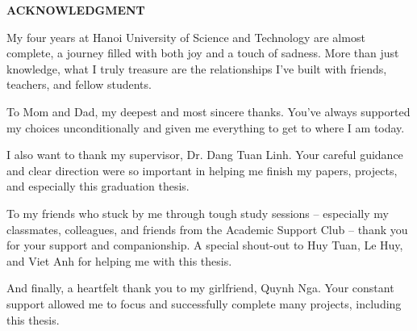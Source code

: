 \documentclass[../main.tex]{subfiles}
\begin{document}
\begin{center}
    \Large{\textbf{ACKNOWLEDGMENT}}\\
\end{center}
\vspace{1cm}

My four years at Hanoi University of Science and Technology are almost complete, a journey filled with both joy and a touch of sadness. More than just knowledge, what I truly treasure are the relationships I've built with friends, teachers, and fellow students.

To Mom and Dad, my deepest and most sincere thanks. You've always supported my choices unconditionally and given me everything to get to where I am today.

I also want to thank my supervisor, Dr. Dang Tuan Linh. Your careful guidance and clear direction were so important in helping me finish my papers, projects, and especially this graduation thesis.

To my friends who stuck by me through tough study sessions – especially my classmates, colleagues, and friends from the Academic Support Club – thank you for your support and companionship. A special shout-out to Huy Tuan, Le Huy, and Viet Anh for helping me with this thesis.

And finally, a heartfelt thank you to my girlfriend, Quynh Nga. Your constant support allowed me to focus and successfully complete many projects, including this thesis.
\end{document}
